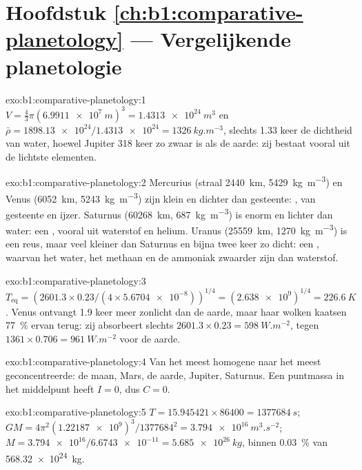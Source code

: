 \section*{Hoofdstuk \ref{ch:b1:comparative-planetology} --- Vergelijkende planetologie}

\begin{solution}{exo:b1:comparative-planetology:1}
$V = \tfrac43\pi(\qty{6.9911e7}{m})^3 = \qty{1.4313e24}{m^3}$ en
$\bar\rho = \num{1898.13e24}/\num{1.4313e24} = \qty{1326}{kg.m^{-3}}$, slechts
1.33 keer de dichtheid van water, hoewel Jupiter 318 keer zo zwaar is als de aarde: zij
bestaat vooral uit de lichtste elementen.
\end{solution}

\begin{solution}{exo:b1:comparative-planetology:2}
Mercurius (straal \qty{2440}{km}, \qty{5429}{kg.m^{-3}}) en Venus
(\qty{6052}{km}, \qty{5243}{kg.m^{-3}}) zijn klein en dichter dan gesteente:
, van gesteente en ijzer. Saturnus (\qty{60268}{km},
\qty{687}{kg.m^{-3}}) is enorm en lichter dan water: een , vooral uit
waterstof en helium. Uranus (\qty{25559}{km}, \qty{1270}{kg.m^{-3}}) is een reus, maar
veel kleiner dan Saturnus en bijna twee keer zo dicht: een , waarvan het water, het
methaan en de ammoniak zwaarder zijn dan waterstof.
\end{solution}

\begin{solution}{exo:b1:comparative-planetology:3}
$T_\mathrm{eq} = (2601.3\times0.23/(4\times\num{5.6704e-8}))^{1/4} =
(\num{2.638e9})^{1/4} = \qty{226.6}{K}$. Venus ontvangt 1.9 keer meer zonlicht dan de aarde,
maar haar wolken kaatsen \qty{77}{\percent} ervan terug: zij absorbeert slechts
$2601.3\times0.23 = \qty{598}{W.m^{-2}}$, tegen $1361\times0.706 = \qty{961}{W.m^{-2}}$ voor de aarde.
\end{solution}

\begin{solution}{exo:b1:comparative-planetology:4}
Van het meest homogene naar het meest geconcentreerde: de maan, Mars, de aarde, Jupiter,
Saturnus. Een puntmassa in het middelpunt heeft $I = 0$, dus $C = 0$.
\end{solution}

\begin{solution}{exo:b1:comparative-planetology:5}
$T = 15.945421\times86400 = \qty{1377684}{s}$;
$GM = 4\pi^2(\num{1.22187e9})^3/\num{1377684}^2 = \qty{3.794e16}{m^3.s^{-2}}$;
$M = \num{3.794e16}/\num{6.6743e-11} = \qty{5.685e26}{kg}$, binnen
\qty{0.03}{\percent} van \qty{568.32e24}{kg}.
\end{solution}

